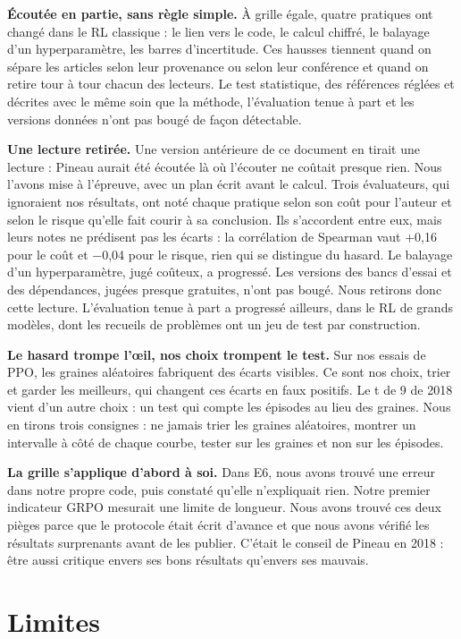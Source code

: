\documentclass[11pt,a4paper]{article}
\begin{document}
\textbf{Écoutée en partie, sans règle simple.} À grille égale, quatre
pratiques ont changé dans le RL classique : le lien vers le code, le
calcul chiffré, le balayage d'un hyperparamètre, les barres
d'incertitude. Ces hausses tiennent quand on sépare les articles selon
leur provenance ou selon leur conférence et quand on retire tour à tour
chacun des lecteurs. Le test statistique, des références réglées et
décrites avec le même soin que la méthode, l'évaluation tenue à part et
les versions données n'ont pas bougé de façon détectable.

\textbf{Une lecture retirée.} Une version antérieure de ce document en
tirait une lecture : Pineau aurait été écoutée là où l'écouter ne
coûtait presque rien. Nous l'avons mise à l'épreuve, avec un plan écrit
avant le calcul. Trois évaluateurs, qui ignoraient nos résultats, ont
noté chaque pratique selon son coût pour l'auteur et selon le risque
qu'elle fait courir à sa conclusion. Ils s'accordent entre eux, mais
leurs notes ne prédisent pas les écarts : la corrélation de Spearman
vaut +0,16 pour le coût et −0,04 pour le risque, rien qui se distingue
du hasard. Le balayage d'un hyperparamètre, jugé coûteux, a progressé.
Les versions des bancs d'essai et des dépendances, jugées presque
gratuites, n'ont pas bougé. Nous retirons donc cette lecture.
L'évaluation tenue à part a progressé ailleurs, dans le RL de grands
modèles, dont les recueils de problèmes ont un jeu de test par
construction.

\textbf{Le hasard trompe l'œil, nos choix trompent le test.} Sur nos
essais de PPO, les graines aléatoires fabriquent des écarts visibles. Ce
sont nos choix, trier et garder les meilleurs, qui changent ces écarts
en faux positifs. Le t de 9 de 2018 vient d'un autre choix : un test qui
compte les épisodes au lieu des graines. Nous en tirons trois consignes
: ne jamais trier les graines aléatoires, montrer un intervalle à côté
de chaque courbe, tester sur les graines et non sur les épisodes.

\textbf{La grille s'applique d'abord à soi.} Dans E6, nous avons trouvé
une erreur dans notre propre code, puis constaté qu'elle n'expliquait
rien. Notre premier indicateur GRPO mesurait une limite de longueur.
Nous avons trouvé ces deux pièges parce que le protocole était écrit
d'avance et que nous avons vérifié les résultats surprenants avant de
les publier. C'était le conseil de Pineau en 2018 : être aussi critique
envers ses bons résultats qu'envers ses mauvais.

\section{Limites}\label{limites}
\end{document}
